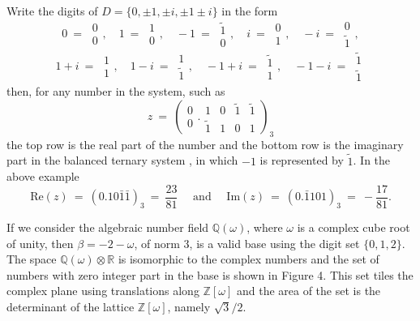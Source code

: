 \documentclass[12pt]{article}
\newcommand{\Q}{\mathbb{Q}}
\newcommand{\R}{\mathbb{R}}
\newcommand{\Z}{\mathbb{Z}}
\begin{document}
Write the digits of $D = \{0, \pm1, \pm i, \pm1\pm i\}$ in the form
$$
0\ = \ \begin{array}{c}0\\0\end{array}, \quad
1\ = \ \begin{array}{c}1\\0\end{array}, \quad
-1\ = \ \begin{array}{c}\tilde1\\0\end{array}, \quad
i\ = \ \begin{array}{c}0\\1\end{array}, \quad
-i\ = \ \begin{array}{c}0\\\tilde1\end{array},
$$
$$
1+i \ = \ \begin{array}{c}1\\1\end{array}, \quad
1-i\ = \ \begin{array}{c}1\\ \tilde1\end{array}, \quad
-1+i\ = \ \begin{array}{c}\tilde1\\1\end{array}, \quad
-1-i\ = \ \begin{array}{c}\tilde1\\\tilde1\end{array}
$$
then, for any number in the system, such as
$$
z \ = \ \left(\begin{array}{c}0\\0\end{array}. \begin{array}{cccc}1&0&\tilde1&\tilde1\\\tilde1&1&0&1\end{array}\right)_3
$$
the top row is the real part of the number and the bottom row is the imaginary part in the balanced ternary system \cite[\S 4.1]{knuth}, in which $-1$ is represented by $\tilde1$. 
In the above example
$$
\mbox{Re}(z) \ = \ (0.10\bar1\bar1)_3 \ = \ \frac{23}{81}\quad \mbox{ and }\quad  \mbox{Im}(z) \ = \ (0.\bar1101)_3 \ = \ -\frac{17}{81}.
$$

    If we consider the algebraic number field $\Q(\omega)$, where $\omega$ is a complex cube root of unity, then $\beta = -2 - \omega$, of norm 3, is a valid base using the digit
set $\{0, 1, 2\}$. The space $\Q(\omega)\otimes\R$ is isomorphic to the complex numbers and the set of numbers with zero integer part in the base is shown in Figure 4.
This set tiles the complex plane using translations along $\Z[\omega]$ and the area of the set is the determinant of the lattice $\Z[\omega]$, namely $\sqrt3/2$.
\end{document}
